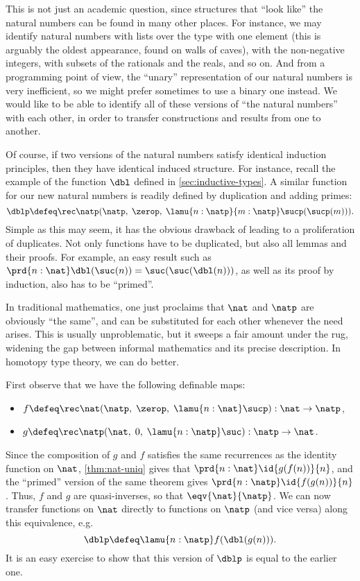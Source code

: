 This is not just an academic question, since structures that ``look like'' the natural numbers can be found in many other places.
%
For instance, we may identify natural numbers with lists over the type with one element (this is arguably the oldest appearance, found on walls of caves), with the non-negative integers, with subsets of the rationals and the reals, and so on.
And from a programming point of view, the ``unary'' representation of our natural numbers is very inefficient, so we might prefer sometimes to use a binary one instead.
We would like to be able to identify all of these versions of ``the natural numbers'' with each other, in order to transfer constructions and results from one to another.

Of course, if two versions of the natural numbers satisfy identical induction principles, then they have identical induced structure.
For instance, recall the example of the function $\dbl$ defined in \cref{sec:inductive-types}. A similar function
for our new natural numbers is readily defined by duplication and adding primes:
\[ \dblp \defeq \rec\natp(\natp, \; \zerop, \;  \lamu{n:\natp}{m:\natp} \sucp(\sucp(m))). \]
Simple as this may seem, it has the obvious drawback of leading to a
proliferation of duplicates. Not only functions have to be
duplicated, but also all lemmas and their proofs. For example,
an easy result such as  $\prd{n : \nat} \dbl(\suc(n))=\suc(\suc(\dbl(n)))$, as well
as its proof by induction, also has to be ``primed''.

In traditional mathematics, one just proclaims that $\nat$ and $\natp$ are obviously ``the same'', and can be substituted for each other whenever the need arises.
This is usually unproblematic, but it sweeps a fair amount under the rug, widening the gap between informal mathematics and its precise description.
In homotopy type theory, we can do better.

First observe that we have the following definable maps:
\begin{itemize}
\item $f \defeq \rec\nat(\natp, \; \zerop, \;  \lamu{n:\nat} \sucp)
       : \nat \to\natp$,
\item $g \defeq \rec\natp(\nat, \; 0, \;  \lamu{n:\natp} \suc)
       : \natp \to\nat$.
\end{itemize}
Since the composition of $g$ and $f$ satisfies the same recurrences as the identity function on $\nat$, \cref{thm:nat-uniq} gives that $\prd{n : \nat} \id{g(f(n))}{n}$, and the ``primed'' version of the same theorem gives $\prd{n : \natp} \id{f(g(n))}{n}$.
Thus, $f$ and $g$ are quasi-inverses, so that $\eqv{\nat}{\natp}$.
We can now transfer functions on $\nat$ directly to functions on $\natp$ (and vice versa) along this equivalence, e.g.
\[ \dblp \defeq \lamu{n:\natp} f(\dbl(g(n))). \]
It is an easy exercise to show that this version of $\dblp$ is equal to the earlier one.

